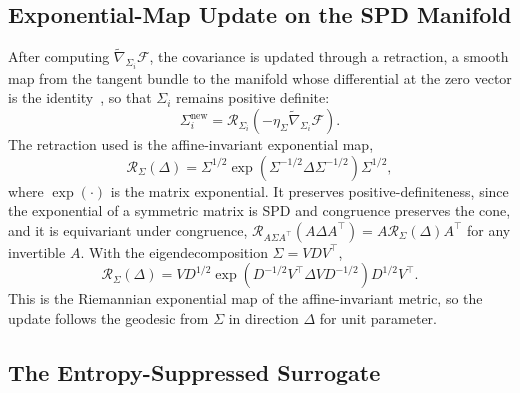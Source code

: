 \documentclass[11pt]{article}
\begin{document}
\subsection*{Exponential-Map Update on the SPD Manifold}

After computing $\tilde{\nabla}_{\Sigma_i}\mathcal{F}$, the covariance is updated through a retraction, a smooth map from the tangent bundle to the manifold whose differential at the zero vector is the identity~\cite{Absil2008}, so that $\Sigma_i$ remains positive definite:
\begin{equation}
\Sigma_i^{\mathrm{new}} = \mathcal{R}_{\Sigma_i}(-\eta_\Sigma \tilde{\nabla}_{\Sigma_i}\mathcal{F}).
\end{equation}
The retraction used is the affine-invariant exponential map,
\begin{equation}
\mathcal{R}_{\Sigma}(\Delta) = \Sigma^{1/2} \exp\left(\Sigma^{-1/2} \Delta \Sigma^{-1/2}\right) \Sigma^{1/2},
\end{equation}
where $\exp(\cdot)$ is the matrix exponential. It preserves positive-definiteness, since the exponential of a symmetric matrix is SPD and congruence preserves the cone, and it is equivariant under congruence, $\mathcal{R}_{A\Sigma A^\top}(A\Delta A^\top) = A \mathcal{R}_{\Sigma}(\Delta) A^\top$ for any invertible $A$. With the eigendecomposition $\Sigma = V D V^\top$,
\begin{equation}
\mathcal{R}_{\Sigma}(\Delta) = V D^{1/2} \exp\left(D^{-1/2} V^\top \Delta V D^{-1/2}\right) D^{1/2} V^\top.
\end{equation}
This is the Riemannian exponential map of the affine-invariant metric, so the update follows the geodesic from $\Sigma$ in direction $\Delta$ for unit parameter.

\subsection*{The Entropy-Suppressed Surrogate}
\end{document}

